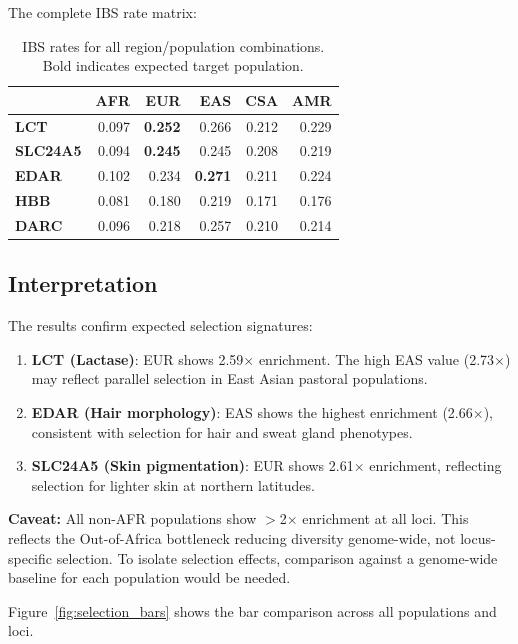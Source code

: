 \documentclass[11pt]{article}
\begin{document}
The complete IBS rate matrix:

\begin{table}[H]
\centering
\begin{tabular}{@{}l|rrrrr@{}}
& \textbf{AFR} & \textbf{EUR} & \textbf{EAS} & \textbf{CSA} & \textbf{AMR} \\
\midrule
\textbf{LCT} & 0.097 & \textbf{0.252} & 0.266 & 0.212 & 0.229 \\
\textbf{SLC24A5} & 0.094 & \textbf{0.245} & 0.245 & 0.208 & 0.219 \\
\textbf{EDAR} & 0.102 & 0.234 & \textbf{0.271} & 0.211 & 0.224 \\
\textbf{HBB} & 0.081 & 0.180 & 0.219 & 0.171 & 0.176 \\
\textbf{DARC} & 0.096 & 0.218 & 0.257 & 0.210 & 0.214 \\
\end{tabular}
\caption{IBS rates for all region/population combinations. Bold indicates expected target population.}
\end{table}

\subsection{Interpretation}

The results confirm expected selection signatures:

\begin{enumerate}
\item \textbf{LCT (Lactase)}: EUR shows 2.59$\times$ enrichment. The high EAS value (2.73$\times$) may reflect parallel selection in East Asian pastoral populations.

\item \textbf{EDAR (Hair morphology)}: EAS shows the highest enrichment (2.66$\times$), consistent with selection for hair and sweat gland phenotypes.

\item \textbf{SLC24A5 (Skin pigmentation)}: EUR shows 2.61$\times$ enrichment, reflecting selection for lighter skin at northern latitudes.
\end{enumerate}

\textbf{Caveat:} All non-AFR populations show $>$2$\times$ enrichment at all loci. This reflects the Out-of-Africa bottleneck reducing diversity genome-wide, not locus-specific selection. To isolate selection effects, comparison against a genome-wide baseline for each population would be needed.

Figure~\ref{fig:selection_bars} shows the bar comparison across all populations and loci.
\end{document}
